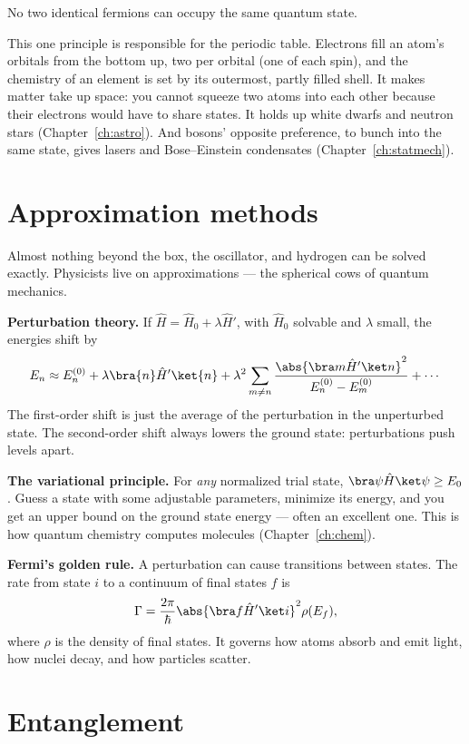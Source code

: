 \begin{law}
No two identical fermions can occupy the same quantum state.
\end{law}

This one principle is responsible for the periodic table. Electrons fill an atom's orbitals from the bottom up, two per orbital (one of each spin), and the chemistry of an element is set by its outermost, partly filled shell. It makes matter take up space: you cannot squeeze two atoms into each other because their electrons would have to share states. It holds up white dwarfs and neutron stars (Chapter~\ref{ch:astro}). And bosons' opposite preference, to bunch into the same state, gives lasers and Bose--Einstein condensates (Chapter~\ref{ch:statmech}).

\section{Approximation methods}

Almost nothing beyond the box, the oscillator, and hydrogen can be solved exactly. Physicists live on approximations --- the spherical cows of quantum mechanics.

\textbf{Perturbation theory.} If $\hat H = \hat H_0 + \lambda\hat H'$, with $\hat H_0$ solvable and $\lambda$ small, the energies shift by
\[
  E_n \approx E_n^{(0)} + \lambda\bra{n}\hat H'\ket{n} + \lambda^2\sum_{m\ne n}\frac{\abs{\bra m\hat H'\ket n}^2}{E_n^{(0)} - E_m^{(0)}} + \cdots
\]
The first-order shift is just the average of the perturbation in the unperturbed state. The second-order shift always lowers the ground state: perturbations push levels apart.

\textbf{The variational principle.} For \emph{any} normalized trial state, $\bra\psi\hat H\ket\psi\ge E_0$. Guess a state with some adjustable parameters, minimize its energy, and you get an upper bound on the ground state energy --- often an excellent one. This is how quantum chemistry computes molecules (Chapter~\ref{ch:chem}).

\textbf{Fermi's golden rule.} A perturbation can cause transitions between states. The rate from state $i$ to a continuum of final states $f$ is
\[
  \Gamma = \frac{2\pi}{\hbar}\abs{\bra f\hat H'\ket i}^2\rho(E_f),
\]
where $\rho$ is the density of final states. It governs how atoms absorb and emit light, how nuclei decay, and how particles scatter.

\section{Entanglement}


